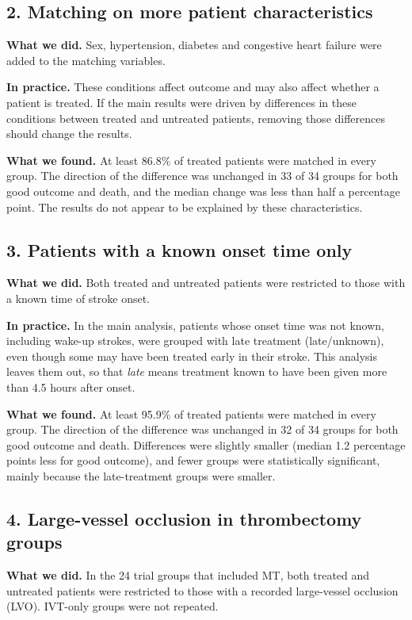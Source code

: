 \subsection*{2. Matching on more patient characteristics}

\textbf{What we did.} Sex, hypertension, diabetes and congestive heart failure were added to the matching variables.

\textbf{In practice.} These conditions affect outcome and may also affect whether a patient is treated. If the main results were driven by differences in these conditions between treated and untreated patients, removing those differences should change the results.

\textbf{What we found.} At least 86.8\% of treated patients were matched in every group. The direction of the difference was unchanged in 33 of 34 groups for both good outcome and death, and the median change was less than half a percentage point. The results do not appear to be explained by these characteristics.

\subsection*{3. Patients with a known onset time only}

\textbf{What we did.} Both treated and untreated patients were restricted to those with a known time of stroke onset.

\textbf{In practice.} In the main analysis, patients whose onset time was not known, including wake-up strokes, were grouped with late treatment (late/unknown), even though some may have been treated early in their stroke. This analysis leaves them out, so that \textit{late} means treatment known to have been given more than 4.5 hours after onset.

\textbf{What we found.} At least 95.9\% of treated patients were matched in every group. The direction of the difference was unchanged in 32 of 34 groups for both good outcome and death. Differences were slightly smaller (median 1.2 percentage points less for good outcome), and fewer groups were statistically significant, mainly because the late-treatment groups were smaller.

\subsection*{4. Large-vessel occlusion in thrombectomy groups}

\textbf{What we did.} In the 24 trial groups that included MT, both treated and untreated patients were restricted to those with a recorded large-vessel occlusion (LVO). IVT-only groups were not repeated.

